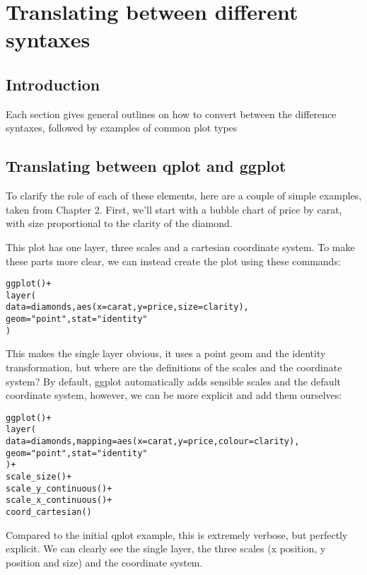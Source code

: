 
\chapter{Translating between different syntaxes}
\label{cha:translating}

\section{Introduction}


Each section gives general outlines on how to convert between the difference syntaxes, followed by examples of common plot types


\section{Translating between qplot and ggplot}
\label{sec:qplot-ggplot}


To clarify the role of each of these elements, here are a couple of simple examples, taken from Chapter 2.  First, we'll start with a bubble chart of price by carat, with size proportional to the clarity of the diamond.


This plot has one layer, three scales and a cartesian coordinate system.  To make these parts more clear, we can instead create the plot using these commands:

\begin{alltt}
ggplot() + 
layer(
  data = diamonds, aes(x = carat, y = price, size = clarity),
  geom = "point", stat = "identity"
)
\end{alltt}

This makes the single layer obvious, it uses a point geom and the identity transformation, but where are the definitions of the scales and the coordinate system?  By default, ggplot automatically adds sensible scales and the default coordinate system, however, we can be more explicit and add them ourselves:

\begin{alltt}
ggplot() + 
layer(
  data = diamonds, mapping = aes(x = carat, y = price, colour = clarity),
  geom = "point", stat = "identity"
) + 
scale_size() + 
scale_y_continuous() + 
scale_x_continuous() + 
coord_cartesian()
\end{alltt}

Compared to the initial qplot example, this is extremely verbose, but perfectly explicit.  We  can clearly see the single layer, the three scales (x position, y position and size) and the coordinate system.  

